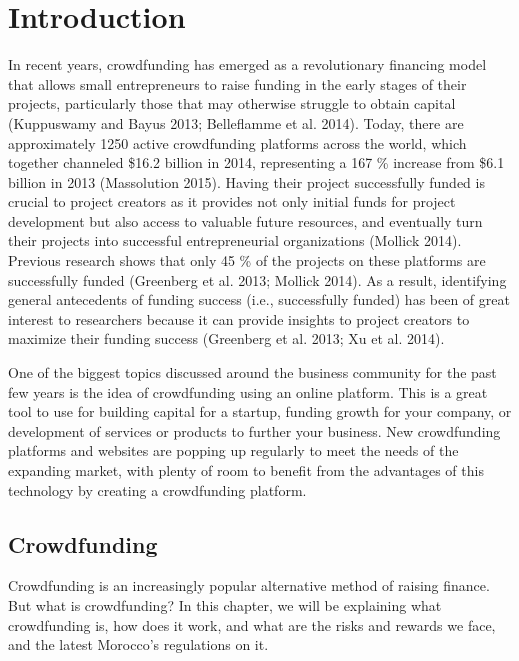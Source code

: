 

\setcounter{mtc}{6}

\chapter*{Introduction}
\label{chap:general_intorduction}
\minitoc
{}%
%
In recent years, crowdfunding has emerged as a revolutionary financing model that allows small entrepreneurs to raise funding in the early stages of their projects, particularly those that may otherwise struggle to obtain capital (Kuppuswamy and Bayus 2013; Belleflamme et al. 2014). Today, there are approximately 1250 active crowdfunding platforms across the world, which together channeled \$16.2 billion in 2014, representing a 167 \% increase from \$6.1 billion in 2013 (Massolution 2015). Having their project successfully funded is crucial to project creators as it provides not only initial funds for project development but also access to valuable future resources, and eventually turn their projects into successful entrepreneurial organizations (Mollick 2014). Previous research shows that only 45 \% of the projects on these platforms are successfully funded (Greenberg et al. 2013; Mollick 2014). As a result, identifying general antecedents of funding success (i.e., successfully funded) has been of great interest to researchers because it can provide insights to project creators to maximize their funding success (Greenberg et al. 2013; Xu et al. 2014).


One of the biggest topics discussed around the business community for the past few years is the idea of crowdfunding using an online platform. This is a great tool to use for building capital for a startup, funding growth for your company, or development of services or products to further your business.
New crowdfunding platforms and websites are popping up regularly to meet the needs of the expanding market, with plenty of room to benefit from the advantages of this technology by creating a crowdfunding platform.

\section*{Crowdfunding}
Crowdfunding is an increasingly popular alternative method of raising finance.
But what is crowdfunding? In this chapter, we will be explaining what crowdfunding is, how does it work, and what are the risks and rewards we face, and the latest Morocco's regulations on it.

